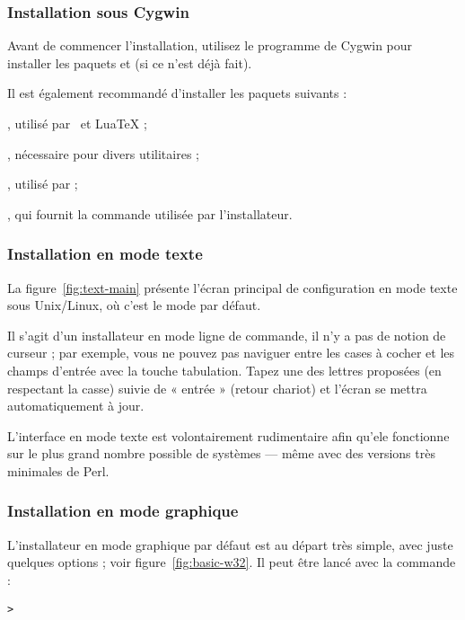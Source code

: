 \documentclass[german, english, french]{article}
\begin{document}
\subsubsection{Installation sous Cygwin}
\label{sec:cygwin}

Avant de commencer l'installation, utilisez le programme  de
Cygwin pour installer les paquets  et  (si ce
n'est déjà fait).

Il est également recommandé d'installer les paquets suivants :
\begin{itemize*}
\item {}, utilisé par \XeTeX\ et Lua\TeX{} ;
\item {}, nécessaire pour divers utilitaires ;
\item {}, utilisé par  ;
\item {}, qui fournit la commande  utilisée par
  l'installateur.
\end{itemize*}

\subsubsection{Installation en mode texte}

La figure~\ref{fig:text-main} présente l'écran principal de configuration en
mode texte sous Unix/Linux, où c'est le mode par défaut.

Il s'agit d'un installateur en mode ligne de commande, il n'y a pas de notion de
curseur ; par exemple, vous ne pouvez pas naviguer entre les cases à cocher et
les champs d'entrée avec la touche tabulation. Tapez une des lettres proposées
(en respectant la casse) suivie de « entrée » (retour chariot) et l'écran se
mettra automatiquement à jour.

L'interface en mode texte est volontairement rudimentaire afin qu'ele fonctionne
sur le plus grand nombre possible de systèmes --- même avec des versions très
minimales de Perl.

\subsubsection{Installation en mode graphique}
\label{sec:graphical-inst}

L'installateur en mode graphique par défaut est au départ très simple, avec
juste quelques options ; voir figure~\ref{fig:basic-w32}. Il peut être lancé
avec la commande :
\begin{alltt}
> 
\end{alltt}
\end{document}
